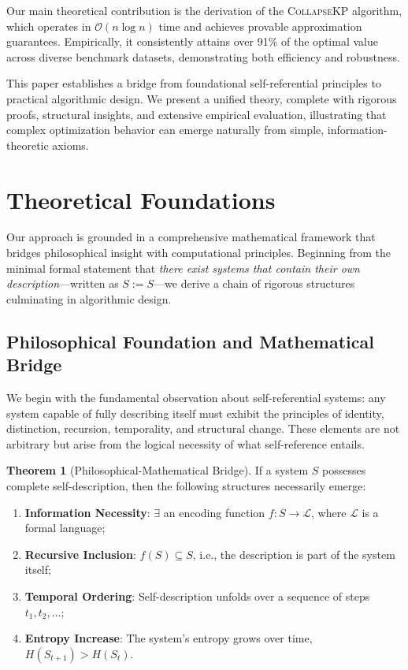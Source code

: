 \documentclass[11pt]{article}
\theoremstyle{remark}
\theoremstyle{definition}
\newtheorem{theorem}{Theorem}
\begin{document}
Our main theoretical contribution is the derivation of the \textsc{CollapseKP} algorithm, which operates in $\mathcal{O}(n \log n)$ time and achieves provable approximation guarantees. Empirically, it consistently attains over 91\% of the optimal value across diverse benchmark datasets, demonstrating both efficiency and robustness.

This paper establishes a bridge from foundational self-referential principles to practical algorithmic design. We present a unified theory, complete with rigorous proofs, structural insights, and extensive empirical evaluation, illustrating that complex optimization behavior can emerge naturally from simple, information-theoretic axioms.


\section{Theoretical Foundations}

Our approach is grounded in a comprehensive mathematical framework that bridges philosophical insight with computational principles. Beginning from the minimal formal statement that \emph{there exist systems that contain their own description}—written as $S := S$—we derive a chain of rigorous structures culminating in algorithmic design.

\subsection{Philosophical Foundation and Mathematical Bridge}

We begin with the fundamental observation about self-referential systems: any system capable of fully describing itself must exhibit the principles of identity, distinction, recursion, temporality, and structural change. These elements are not arbitrary but arise from the logical necessity of what self-reference entails.

\begin{theorem}[Philosophical-Mathematical Bridge]
\label{thm:phil-math-bridge}
If a system $S$ possesses complete self-description, then the following structures necessarily emerge:
\begin{enumerate}
\item \textbf{Information Necessity}: $\exists$ an encoding function $f: S \to \mathcal{L}$, where $\mathcal{L}$ is a formal language;
\item \textbf{Recursive Inclusion}: $f(S) \subseteq S$, i.e., the description is part of the system itself;
\item \textbf{Temporal Ordering}: Self-description unfolds over a sequence of steps $t_1, t_2, \ldots$;
\item \textbf{Entropy Increase}: The system’s entropy grows over time, $H(S_{t+1}) > H(S_t)$.
\end{enumerate}
\end{theorem}
\end{document}
